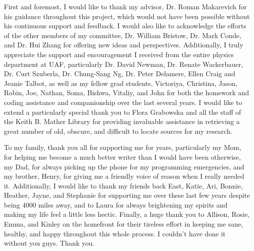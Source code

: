 
First and foremost, I would like to thank my advisor, Dr. Roman Makarevich for his guidance throughout this project, which would not have been possible without his continuous support and feedback.  I would also like to acknowledge the efforts of the other members of my committee, Dr. William Bristow, Dr. Mark Conde, and Dr. Hui Zhang for offering new ideas and perspectives.  Additionally, I truly appreciate the support and encouragement I received from the entire physics department at UAF, particularly Dr. David Newman, Dr. Renate Wackerbauer, Dr. Curt Szuberla, Dr. Chung-Sang Ng, Dr. Peter Delamere, Ellen Craig and Jeanie Talbot, as well as my fellow grad students, Victoriya, Christina, Jason, Robin, Joe, Nathan, Soma, Bishwa, Vitaliy, and John for both the homework and coding assistance and companionship over the last several years.  I would like to extend a particularly special thank you to Flora Grabowska and all the staff of the Keith B. Mather Library for providing invaluable assistance in retrieving a great number of old, obscure, and difficult to locate sources for my research.  

To my family, thank you all for supporting me for years, particularly my Mom, for helping me become a much better writer than I would have been otherwise, my Dad, for always picking up the phone for my programming emergencies, and my brother, Henry, for giving me a friendly voice of reason when I really needed it.  Additionally, I would like to thank my friends back East, Katie, Ari, Bonnie, Heather, Jayne, and Stephanie for supporting me over these last few years despite being 4000 miles away, and to Laura for always brightening my spirits and making my life feel a little less hectic.  Finally, a huge thank you to Allison, Rosie, Emma, and Kinley on the homefront for their tireless effort in keeping me sane, healthy, and happy throughout this whole process.  I couldn't have done it without you guys.  Thank you.